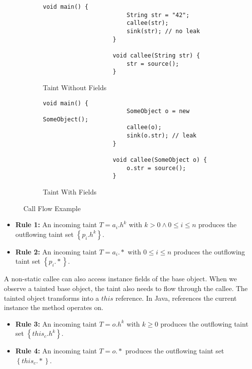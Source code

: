 \documentclass[../draft.tex]{subfiles}
\begin{document}
    \begin{figure}[t]
        \centering
        \begin{subfigure}[b]{0.45\textwidth}
            \centering
            \begin{adjustbox}{max width=\columnwidth}
                \begin{lstlisting}[gobble=20]
                    void main() {
                        String str = "42";
                        callee(str);
                        sink(str); // no leak
                    }
            
                    void callee(String str) {
                        str = source();
                    }
                \end{lstlisting}
            \end{adjustbox}
            \caption{Taint Without Fields}
        \end{subfigure}
        \qquad
        \begin{subfigure}[b]{0.45\textwidth}
            \centering
            \begin{adjustbox}{max width=\columnwidth}
                \begin{lstlisting}[gobble=20]
                    void main() {
                        SomeObject o = new SomeObject();
                        callee(o);
                        sink(o.str); // leak
                    }
            
                    void callee(SomeObject o) {
                        o.str = source();
                    }
                \end{lstlisting}
            \end{adjustbox}
            \caption{Taint With Fields}
        \end{subfigure}
        \caption{Call Flow Example}
        \label{lst:primret} 
    \end{figure}

    \begin{itemize}
        \item[] \textbf{Rule 1:} An incoming taint $T=a_i.h^k$ with $k > 0 \land 0 \leq i \leq n$ produces the outflowing taint set $\left\{p_i.h^k\right\}$.
        \item[] \textbf{Rule 2:} An incoming taint $T=a_i.*$ with $0 \leq i \leq n$ produces the outflowing taint set $\left\{p_i.*\right\}$.
    \end{itemize}

    A non-static callee can also access instance fields of the base object. When we observe a tainted base object, the taint also needs to flow through the callee. The tainted object transforms into a $\mathit{this}$ reference. In Java,  references the current instance the method operates on.
    \begin{itemize}
        \item[] \textbf{Rule 3:} An incoming taint $T=o.h^k$ with $k \geq 0$ produces the outflowing taint set $\left\{\mathit{this}_c.h^k\right\}$. 
        \item[] \textbf{Rule 4:} An incoming taint $T=o.*$ produces the outflowing taint set $\left\{\mathit{this}_c.*\right\}$.
    \end{itemize}
    
\end{document}
